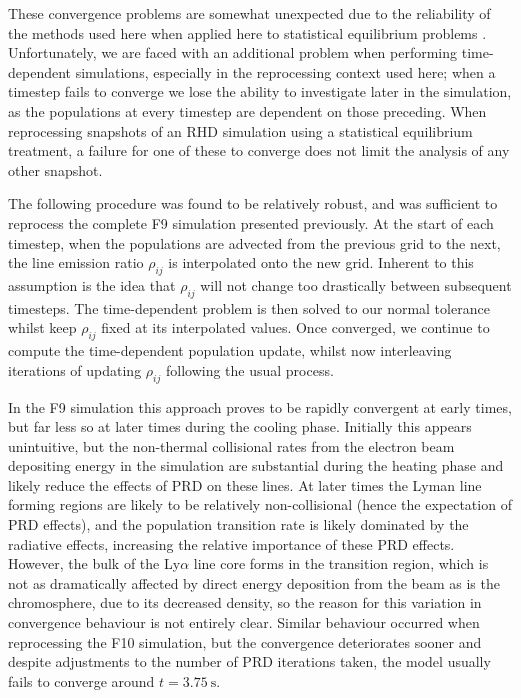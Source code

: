 These convergence problems are somewhat unexpected due to the reliability of the methods used here when applied here to statistical equilibrium problems \citep[e.g.][]{Uitenbroek2001}.
Unfortunately, we are faced with an additional problem when performing time-dependent simulations, especially in the reprocessing context used here; when a timestep fails to converge we lose the ability to investigate later in the simulation, as the populations at every timestep are dependent on those preceding.
When reprocessing snapshots of an RHD simulation using a statistical equilibrium treatment, a failure for one of these to converge does not limit the analysis of any other snapshot.

The following procedure was found to be relatively robust, and was sufficient to reprocess the complete F9 simulation presented previously.
At the start of each timestep, when the populations are advected from the previous grid to the next, the line emission ratio $\rho_{ij}$ is interpolated onto the new grid.
Inherent to this assumption is the idea that $\rho_{ij}$ will not change too drastically between subsequent timesteps.
The time-dependent problem is then solved to our normal tolerance whilst keep $\rho_{ij}$ fixed at its interpolated values.
Once converged, we continue to compute the time-dependent population update, whilst now interleaving iterations of updating $\rho_{ij}$ following the usual process.

In the F9 simulation this approach proves to be rapidly convergent at early times, but far less so at later times during the cooling phase.
Initially this appears unintuitive, but the non-thermal collisional rates from the electron beam depositing energy in the simulation are substantial during the heating phase and likely reduce the effects of PRD on these lines.
At later times the Lyman line forming regions are likely to be relatively non-collisional (hence the expectation of PRD effects), and the population transition rate is likely dominated by the radiative effects, increasing the relative importance of these PRD effects.
However, the bulk of the Ly$\alpha$ line core forms in the transition region, which is not as dramatically affected by direct energy deposition from the beam as is the chromosphere, due to its decreased density, so the reason for this variation in convergence behaviour is not entirely clear.
Similar behaviour occurred when reprocessing the F10 simulation, but the convergence deteriorates sooner and despite adjustments to the number of PRD iterations taken, the model usually fails to converge around $t=\SI{3.75}{\second}$.

